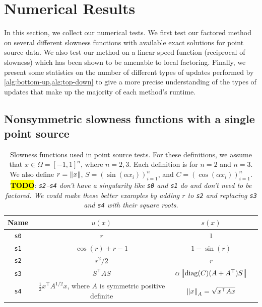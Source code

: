 \documentclass[sisc-eikonal.tex]{subfiles}
\begin{document}
\section{Numerical Results}\label{sec:numerical-results} In this
section, we collect our numerical tests. We first test our factored
method on several different slowness functions with available exact
solutions for point source data. We also test our method on a linear
speed function (reciprocal of slowness) which has been shown to be
amenable to local factoring. Finally, we present some statistics on
the number of different types of updates performed by
\cref{alg:bottom-up,alg:top-down} to give a more precise understanding
of the types of updates that make up the majority of each method's
runtime.

\subsection[Single point source]{Nonsymmetric slowness functions with
  a single point source}\label{ssec:point-source-problems}

\begin{table}
  \centering
  \begin{tabular}{cccc}
    Name & $u(x)$ & $s(x)$ \\
    \midrule
    \texttt{s0} & $r$ & $1$ \\
    \texttt{s1} & $\cos(r) + r - 1$ & $1 - \sin(r)$ \\
    \texttt{s2} & $r^2/2$ & $r$ \\
    \texttt{s3} & $S^\top A S$ & $\alpha\left\|\operatorname{diag}(C){(A + A^\top)}S\right\|$ \\
    \texttt{s4} & $\tfrac{1}{2} x^\top A^{1/2} x$, where $A$ is symmetric positive definite & $\left\|x\right\|_A = \sqrt{x^\top A x}$
  \end{tabular}
  \caption{Slowness functions used in point source tests. For these
    definitions, we assume that $x \in \Omega = [-1, 1]^n$, where
    $n = 2, 3$. Each definition is for $n = 2$ and $n = 3$. We also
    define $r = \left\|x\right\|$, $S = (\sin(\alpha x_i))_{i=1}^n$, and
    $C = (\cos(\alpha x_i))_{i=1}^n$. \hl{\textbf{TODO}}:
    \emph{\texttt{s2}--\texttt{s4} don't have a singularity like
        \texttt{s0} and \texttt{s1} do and don't need to be factored. We
        could make these better examples by adding $r$ to \texttt{s2}
        and replacing \texttt{s3} and \texttt{s4} with their square
        roots.}}\label{table:slowness-functions}
\end{table}
\end{document}
